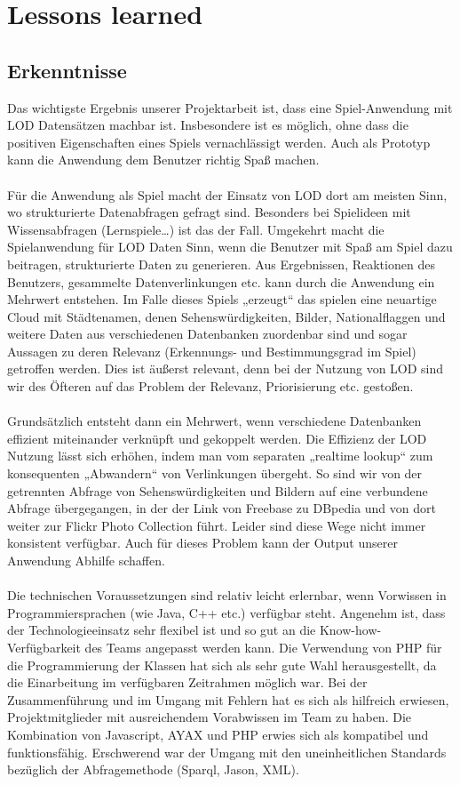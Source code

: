 \documentclass[a4paper, 11pt]{article}
\begin{document}
\section{Lessons learned}
\subsection{Erkenntnisse}
Das wichtigste Ergebnis unserer Projektarbeit ist, dass eine Spiel-Anwendung mit LOD Datensätzen machbar ist. Insbesondere ist es möglich, ohne dass die positiven Eigenschaften eines Spiels vernachlässigt werden. Auch als Prototyp kann die Anwendung dem Benutzer richtig Spaß machen.\\\\
Für die Anwendung als Spiel macht der Einsatz von LOD dort am meisten Sinn, wo strukturierte Datenabfragen gefragt sind. Besonders bei Spielideen mit Wissensabfragen (Lernspiele…) ist das der Fall. Umgekehrt macht die Spielanwendung für LOD Daten Sinn, wenn die Benutzer mit Spaß am Spiel dazu beitragen, strukturierte Daten zu generieren. Aus Ergebnissen, Reaktionen des Benutzers, gesammelte Datenverlinkungen etc. kann durch die Anwendung ein Mehrwert entstehen. Im Falle dieses Spiels „erzeugt“ das spielen eine neuartige Cloud mit Städtenamen, denen Sehenswürdigkeiten, Bilder, Nationalflaggen und weitere Daten aus verschiedenen Datenbanken zuordenbar sind und sogar Aussagen zu deren Relevanz (Erkennungs- und Bestimmungsgrad im Spiel) getroffen werden. Dies ist äußerst relevant, denn bei der Nutzung von LOD sind wir des Öfteren auf das Problem der Relevanz, Priorisierung etc. gestoßen.\\\\
Grundsätzlich entsteht dann ein Mehrwert, wenn verschiedene Datenbanken effizient miteinander verknüpft und  gekoppelt werden. Die Effizienz der LOD Nutzung lässt sich erhöhen, indem man vom separaten „realtime lookup“ zum konsequenten  „Abwandern“ von Verlinkungen übergeht.  So sind wir von der getrennten Abfrage von Sehenswürdigkeiten und Bildern auf eine verbundene Abfrage übergegangen, in der der Link von Freebase zu DBpedia und von dort weiter zur Flickr Photo Collection führt. Leider sind diese Wege nicht immer konsistent verfügbar. Auch für dieses Problem kann der Output unserer Anwendung Abhilfe schaffen.\\\\
Die technischen Voraussetzungen sind relativ leicht erlernbar, wenn Vorwissen in Programmiersprachen (wie Java, C++ etc.) verfügbar steht. Angenehm ist, dass der Technologieeinsatz sehr flexibel ist und so gut an die Know-how- Verfügbarkeit des Teams angepasst werden kann. Die Verwendung von PHP für die Programmierung der Klassen hat sich als sehr gute Wahl herausgestellt, da die Einarbeitung im verfügbaren Zeitrahmen möglich war. Bei der Zusammenführung und im Umgang mit Fehlern hat es sich als hilfreich erwiesen, Projektmitglieder mit ausreichendem Vorabwissen im Team zu haben. Die Kombination von Javascript, AYAX und PHP erwies sich als kompatibel und funktionsfähig. Erschwerend war der Umgang mit den uneinheitlichen Standards bezüglich der Abfragemethode (Sparql, Jason, XML). \\\\
\end{document}
